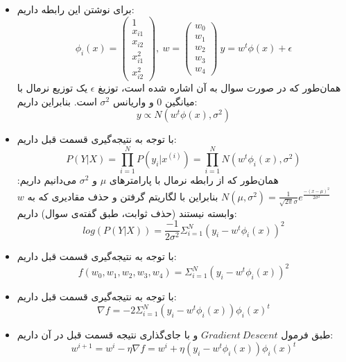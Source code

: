 
\begin{itemize}
	\item برای نوشتن این رابطه داریم:
	$$
	\phi_i(x) = \begin{pmatrix}
	1 \\
	x_{i1}\\
	x_{i2}\\
	x_{i1}^2\\
	x_{i2}^2
	\end{pmatrix}, \: w = \begin{pmatrix}
	w_0\\
	w_1\\
	w_2\\
	w_3\\
	w_4
	\end{pmatrix} \: y = w^t\phi(x) + \epsilon
	$$
	همان‌طور که در صورت سوال به آن اشاره شده است، توزیغ $\epsilon$ یک توزیع نرمال با میانگین $0$ و واریانس $\sigma^2$ است. بنابراین داریم:
	$$
	y \propto N(w^t\phi(x), \sigma^2)
	$$
	\item با توجه به نتیجه‌گیری قسمت قبل داریم:
	$$
	P(Y|X) = \prod_{i = 1}^{N}P(y_i | x^{(i)}) = \prod_{i = 1}^{N}N(w^t\phi_i(x), \sigma^2)
	$$
	همان‌طور که از رابطه نرمال با پارامتر‌های $\mu$ و $\sigma^2$ می‌دانیم داریم:
	$
	N(\mu, \sigma^2) = \frac{1}{\sqrt{2\pi}\sigma}e^{\frac{-(x - \mu)^2}{2\sigma^2}}
	$
	بنابراین با لگاریتم گرفتن و حذف مقادیری که به $w$ وابسته نیستند (حذف ثوابت، طبق گفته‌ی سوال) داریم:
	$$
	log(P(Y|X)) = \frac{-1}{2\sigma^2}\Sigma_{i = 1}^{N}(y_i - w^t\phi_i(x))^2
	$$
	\item 
	با توجه به نتیجه‌گیری قسمت قبل داریم:
	$$
	f(w_0, w_1, w_2, w_3, w_4) = \Sigma_{i = 1}^{N}(y_i - w^t\phi_i(x))^2
	$$
	\item با توجه به نتیجه‌گیری قسمت قبل داریم:
	$$
	\nabla f = -2 \Sigma_{i = 1}^{N}(y_i - w^t\phi_i(x))\phi_i(x)^t
	$$
	\item طبق فرمول $Gradient \: Descent$ و با جای‌گذاری نتیجه قسمت قبل در آن داریم:
	$$
	w^{i + 1} = w^i - \eta \nabla f = w^i + \eta (y_i - w^t\phi_i(x))\phi_i(x)^t
	$$
\end{itemize}